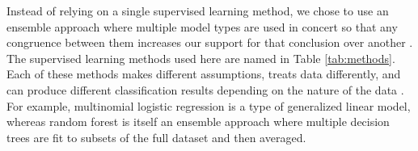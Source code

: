\documentclass[fleqn,10pt,lineno]{wlpeerj} %
\begin{document}
\begin{table}
  \centering
  \caption{Table of the supervised learning methods used in this analysis.}
  \label{tab:methods}
\end{table}

Instead of relying on a single supervised learning method, we chose to use an ensemble approach where multiple model types are used in concert so that any congruence between them increases our support for that conclusion over another \citep{Hastie2009}. The supervised learning methods used here are named in Table \ref{tab:methods}. Each of these methods makes different assumptions, treats data differently, and can produce different classification results depending on the nature of the data \citep{Hastie2009}. For example, multinomial logistic regression is a type of generalized linear model, whereas random forest is itself an ensemble approach where multiple decision trees are fit to subsets of the full dataset and then averaged.
\end{document}
